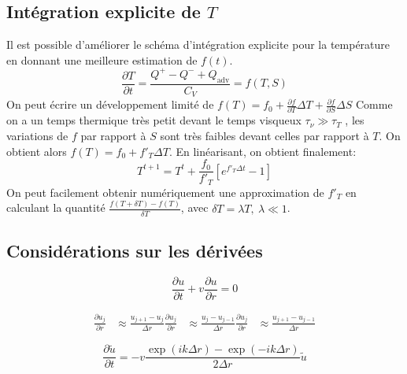 \subsection{Intégration explicite de $T$}
\label{ssec:integration_T}
Il est possible d'améliorer le schéma d'intégration explicite pour la température en donnant une meilleure estimation de $f(t)$.
\begin{equation}
  \frac{\partial T}{\partial t} = \frac{Q^+ - Q^- + Q_\textrm{adv}}{C_V} = f(T, S)
\end{equation}
On peut écrire un développement limité de $f(T) = f_0 + \frac{\partial f}{\partial T}\Delta T + \frac{\partial f}{\partial S}\Delta S$
Comme on a un temps thermique très petit devant le temps visqueux $\tau_\nu \gg \tau_T$ 
, les variations de $f$ par rapport à $S$ sont très faibles devant celles par rapport à $T$. On obtient alors $f(T) = f_0 + f'_T \Delta T$. En linéarisant, on obtient finalement:
\begin{equation}
  T^{t+1} = T^t + \frac{f_0}{f'_T}\left[e^{f'_T\Delta t} - 1 \right] 
\end{equation}
On peut facilement obtenir numériquement une approximation de $f'_T$ en calculant la quantité $\frac{f(T+\delta T) - f(T)}{\delta T}$, avec $\delta T = \lambda T,\ \lambda \ll 1$. 

\subsection{Considérations sur les dérivées}

\begin{equation}
    \frac{\partial u}{\partial t} + v \frac{\partial u}{\partial r} = 0
\end{equation}

\begin{align}
    \frac{\partial u_j}{\partial r} &\approx \frac{u_{j+1} - u_j}{\Delta{r}}
    \frac{\partial u_j}{\partial r} &\approx \frac{u_j - u_{j-1}}{\Delta{r}}
    \frac{\partial u_j}{\partial r} &\approx \frac{u_{j+1} - u_{j-1}}{\Delta{r}}
\end{align}

\begin{equation}
    \frac{\partial \tilde{u}}{\partial t} = - v \frac{\exp(ik\Delta{r}) - \exp(-ik\Delta{r})}{2 \Delta{r}} \tilde{u}
\end{equation}


